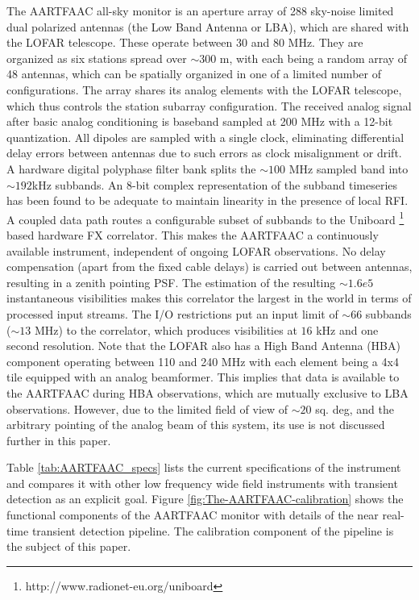 \documentclass{aa}
\begin{document}
The AARTFAAC all-sky monitor is an  aperture array of 288 sky-noise limited dual
polarized antennas  (the Low  Band Antenna  or LBA), which  are shared  with the
LOFAR telescope.   These operate between 30  and 80 MHz.  They  are organized as
six stations  spread over $\sim$$300$  m, with each  being a random array  of 48
antennas,  which can  be  spatially organized  in  one of  a  limited number  of
configurations.  The array shares its  analog elements with the LOFAR telescope,
which  thus controls the  station subarray  configuration.  The  received analog
signal after  basic analog conditioning  is baseband sampled  at 200 MHz  with a
12-bit quantization.  All  dipoles are sampled with a  single clock, eliminating
differential  delay  errors  between  antennas  due  to  such  errors  as  clock
misalignment  or drift.   A hardware  digital polyphase  filter bank  splits the
$\sim$$100$  MHz sampled band  into $\sim$$192$kHz  subbands.  An  8-bit complex
representation  of the  subband  timeseries has  been  found to  be adequate  to
maintain linearity in  the presence of local RFI.  A coupled  data path routes a
configurable          subset         of         subbands          to         the
Uniboard   \footnote{http://www.radionet-eu.org/uniboard}   based  hardware   FX
correlator.   This  makes  the  AARTFAAC a  continuously  available  instrument,
independent of  ongoing LOFAR observations.   No delay compensation  (apart from
the fixed cable  delays) is carried out between antennas,  resulting in a zenith
pointing  PSF.   The estimation  of  the  resulting $\sim$$1.6e5$  instantaneous
visibilities  makes  this  correlator the  largest  in  the  world in  terms  of
processed input streams.  The I/O  restrictions put an input limit of $\sim$$66$
subbands ($\sim$$13$ MHz) to the correlator, which produces visibilities at $16$
kHz and one second resolution. Note that  the LOFAR also has a High Band Antenna
(HBA) component operating between 110 and  240 MHz with each element being a 4x4
tile equipped with an analog beamformer.  This implies that data is available to
the  AARTFAAC during  HBA  observations,  which are  mutually  exclusive to  LBA
observations.  However, due to the limited  field of view of $\sim$$20$ sq. deg,
and the  arbitrary pointing of the  analog beam of  this system, its use  is not
discussed further in this paper.

Table   \ref{tab:AARTFAAC_specs}  lists  the   current  specifications   of  the
instrument and compares it with other low frequency wide field instruments with
transient      detection       as      an      explicit       goal.       Figure
\ref{fig:The-AARTFAAC-calibration}  shows  the   functional  components  of  the
AARTFAAC  monitor  with  details  of  the near  real-time  transient  detection
pipeline.   The calibration component  of the  pipeline is  the subject  of this
paper.
\end{document}
